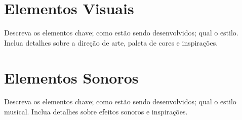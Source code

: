 
\section{Elementos Visuais}

Descreva os elementos chave; como estão sendo desenvolvidos; qual o estilo. Inclua detalhes sobre a direção de arte, paleta de cores e inspirações.

\section{Elementos Sonoros}

Descreva os elementos chave; como estão sendo desenvolvidos; qual o estilo musical. Inclua detalhes sobre efeitos sonoros e inspirações.